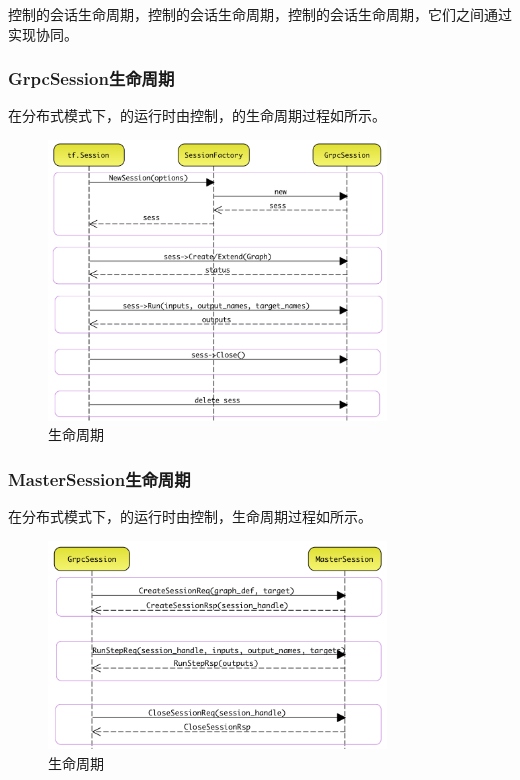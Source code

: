 \begin{content}
\begin{content}
\begin{content}
控制的会话生命周期，控制的会话生命周期，控制的会话生命周期，它们之间通过实现协同。

\subsubsection{GrpcSession生命周期}

在分布式模式下，的运行时由控制，的生命周期过程如所示。

\begin{figure}[H]
\centering
\includegraphics[width=0.8\textwidth]{figures/dist-grpc-session-life-cycle.png}
\caption{生命周期}
 \label{fig:dist-grpc-session-life-cycle}
\end{figure}

\subsubsection{MasterSession生命周期}

在分布式模式下，的运行时由控制，生命周期过程如所示。

\begin{figure}[H]
\centering
\includegraphics[width=0.8\textwidth]{figures/dist-master-session-life-cycle.png}
\caption{生命周期}
 \label{fig:dist-master-session-life-cycle}
\end{figure}


\end{content}
\end{content}
\end{content}
